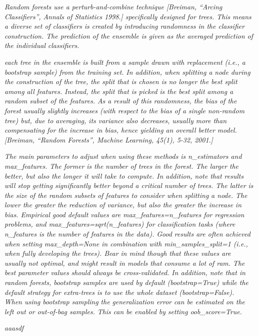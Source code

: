 \textit{Random forests use a perturb-and-combine technique [Breiman, “Arcing Classifiers”, Annals of Statistics 1998.] specifically designed for trees. This means a diverse set of classifiers is created by introducing randomness in the classifier construction. The prediction of the ensemble is given as the averaged prediction of the individual classifiers.}

\textit{each tree in the ensemble is built from a sample drawn with replacement (i.e., a bootstrap sample) from the training set. In addition, when splitting a node during the construction of the tree, the split that is chosen is no longer the best split among all features. Instead, the split that is picked is the best split among a random subset of the features. As a result of this randomness, the bias of the forest usually slightly increases (with respect to the bias of a single non-random tree) but, due to averaging, its variance also decreases, usually more than compensating for the increase in bias, hence yielding an overall better model. [Breiman, “Random Forests”, Machine Learning, 45(1), 5-32, 2001.] }

\textit{The main parameters to adjust when using these methods is n_estimators and max_features. The former is the number of trees in the forest. The larger the better, but also the longer it will take to compute. In addition, note that results will stop getting significantly better beyond a critical number of trees. The latter is the size of the random subsets of features to consider when splitting a node. The lower the greater the reduction of variance, but also the greater the increase in bias. Empirical good default values are max_features=n_features for regression problems, and max_features=sqrt(n_features) for classification tasks (where n_features is the number of features in the data). Good results are often achieved when setting max_depth=None in combination with min_samples_split=1 (i.e., when fully developing the trees). Bear in mind though that these values are usually not optimal, and might result in models that consume a lot of ram. The best parameter values should always be cross-validated. In addition, note that in random forests, bootstrap samples are used by default (bootstrap=True) while the default strategy for extra-trees is to use the whole dataset (bootstrap=False). When using bootstrap
sampling the generalization error can be estimated on the left out or out-of-bag samples. This can be enabled by setting oob_score=True.}



\textit{aaasdf}





